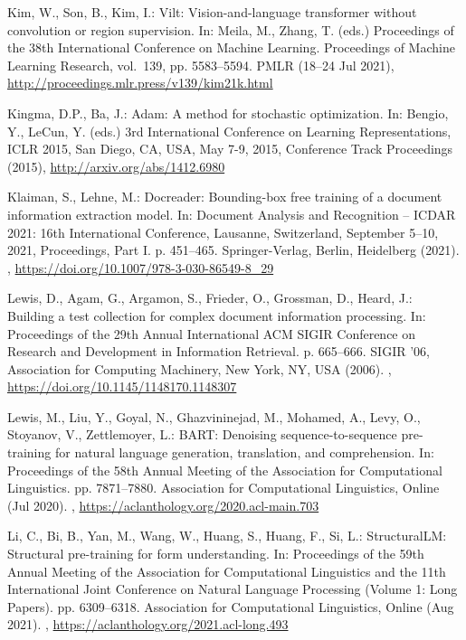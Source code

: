 \documentclass[runningheads]{llncs}
\begin{document}
\begin{thebibliography}{10}
Kim, W., Son, B., Kim, I.: Vilt: Vision-and-language transformer without
  convolution or region supervision. In: Meila, M., Zhang, T. (eds.)
  Proceedings of the 38th International Conference on Machine Learning.
  Proceedings of Machine Learning Research, vol.~139, pp. 5583--5594. PMLR
  (18--24 Jul 2021), \url{http://proceedings.mlr.press/v139/kim21k.html}

Kingma, D.P., Ba, J.: Adam: {A} method for stochastic optimization. In: Bengio,
  Y., LeCun, Y. (eds.) 3rd International Conference on Learning
  Representations, {ICLR} 2015, San Diego, CA, USA, May 7-9, 2015, Conference
  Track Proceedings (2015), \url{http://arxiv.org/abs/1412.6980}

Klaiman, S., Lehne, M.: Docreader: Bounding-box free training of a document
  information extraction model. In: Document Analysis and Recognition – ICDAR
  2021: 16th International Conference, Lausanne, Switzerland, September 5–10,
  2021, Proceedings, Part I. p. 451–465. Springer-Verlag, Berlin, Heidelberg
  (2021). ,
  \url{https://doi.org/10.1007/978-3-030-86549-8\_29}

Lewis, D., Agam, G., Argamon, S., Frieder, O., Grossman, D., Heard, J.:
  Building a test collection for complex document information processing. In:
  Proceedings of the 29th Annual International ACM SIGIR Conference on Research
  and Development in Information Retrieval. p. 665–666. SIGIR '06,
  Association for Computing Machinery, New York, NY, USA (2006).
  , \url{https://doi.org/10.1145/1148170.1148307}

Lewis, M., Liu, Y., Goyal, N., Ghazvininejad, M., Mohamed, A., Levy, O.,
  Stoyanov, V., Zettlemoyer, L.: {BART}: Denoising sequence-to-sequence
  pre-training for natural language generation, translation, and comprehension.
  In: Proceedings of the 58th Annual Meeting of the Association for
  Computational Linguistics. pp. 7871--7880. Association for Computational
  Linguistics, Online (Jul 2020). ,
  \url{https://aclanthology.org/2020.acl-main.703}

Li, C., Bi, B., Yan, M., Wang, W., Huang, S., Huang, F., Si, L.:
  {S}tructural{LM}: Structural pre-training for form understanding. In:
  Proceedings of the 59th Annual Meeting of the Association for Computational
  Linguistics and the 11th International Joint Conference on Natural Language
  Processing (Volume 1: Long Papers). pp. 6309--6318. Association for
  Computational Linguistics, Online (Aug 2021).
  ,
  \url{https://aclanthology.org/2021.acl-long.493}


\end{thebibliography}
\end{document}
